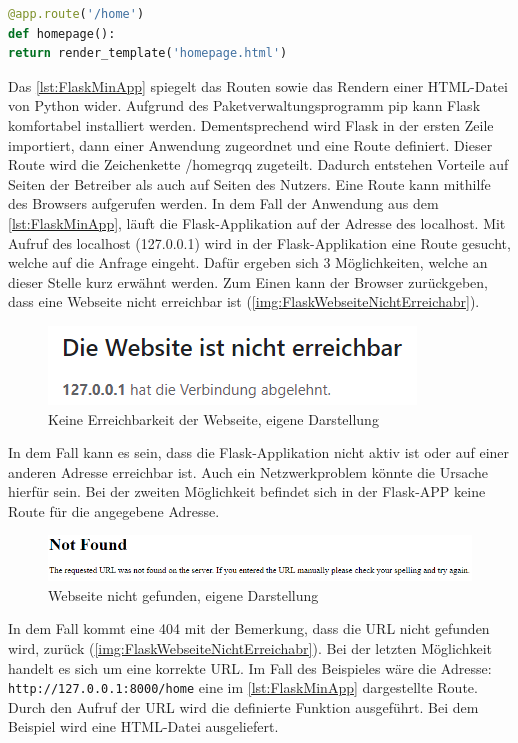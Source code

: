 \documentclass[a4paper,titlepage,halfparskip,12pt]{scrreprt}
\begin{document}
\begin{onehalfspacing}
\begin{lstlisting}[language=Python,caption=Example Listing of Flask Python,label={lst:FlaskMinApp}]
@app.route('/home')
def homepage():
return render_template('homepage.html')
\end{lstlisting}
Das \autoref{lst:FlaskMinApp} spiegelt das Routen sowie das Rendern einer \ac{HTML}-Datei von Python wider. Aufgrund des Paketverwaltungsprogramm pip kann Flask komfortabel installiert werden. Dementsprechend wird Flask in der ersten Zeile importiert, dann einer Anwendung zugeordnet und eine Route definiert. Dieser Route wird die Zeichenkette \glqq /homegrqq{} zugeteilt. Dadurch entstehen Vorteile auf Seiten der Betreiber als auch auf Seiten des Nutzers. Eine Route kann mithilfe des Browsers aufgerufen werden. In dem Fall der Anwendung aus dem \autoref{lst:FlaskMinApp}, läuft die Flask-Applikation auf der Adresse des localhost. Mit Aufruf des localhost (127.0.0.1) wird in der Flask-Applikation eine Route gesucht, welche auf die Anfrage eingeht. Dafür ergeben sich 3 Möglichkeiten, welche an dieser Stelle kurz erwähnt werden. Zum Einen kann der Browser zurückgeben, dass eine Webseite nicht erreichbar ist (\autoref{img:FlaskWebseiteNichtErreichabr}). 
\begin{figure}[h]
	\centering
	\includegraphics[scale=1.5]{images/WebseiteNichtErreichbar}
	\caption{Keine Erreichbarkeit der Webseite, eigene Darstellung}
	\label{img:FlaskWebseiteNichtErreichabr}
\end{figure}
In dem Fall kann es sein, dass die Flask-Applikation nicht aktiv ist oder auf einer anderen Adresse erreichbar ist. Auch ein Netzwerkproblem könnte die Ursache hierfür sein. Bei der zweiten Möglichkeit befindet sich in der Flask-APP keine Route für die angegebene Adresse.
\begin{figure}[h]
	\centering
	\includegraphics[scale=1.0]{images/NotFound}
	\caption{Webseite nicht gefunden, eigene Darstellung}
	\label{img:FlaskWebseiteNotFound}
\end{figure}
In dem Fall kommt eine 404 mit der Bemerkung, dass die URL nicht gefunden wird, zurück (\autoref{img:FlaskWebseiteNichtErreichabr}). Bei der letzten Möglichkeit handelt es sich um eine korrekte URL. Im Fall des Beispieles wäre die Adresse: \texttt{http://127.0.0.1:8000/home} eine im \autoref{lst:FlaskMinApp} dargestellte Route. Durch den Aufruf der URL wird die definierte Funktion ausgeführt. Bei dem Beispiel wird eine HTML-Datei ausgeliefert.

\end{onehalfspacing}
\end{document}
